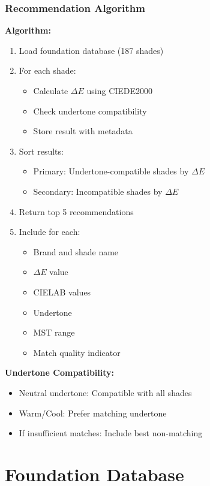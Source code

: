\subsubsection{Recommendation Algorithm}

\textbf{Algorithm:}
\begin{enumerate}
    \item Load foundation database (187 shades)
    \item For each shade:
    \begin{itemize}
        \item Calculate $\Delta E$ using CIEDE2000
        \item Check undertone compatibility
        \item Store result with metadata
    \end{itemize}
    \item Sort results:
    \begin{itemize}
        \item Primary: Undertone-compatible shades by $\Delta E$
        \item Secondary: Incompatible shades by $\Delta E$
    \end{itemize}
    \item Return top 5 recommendations
    \item Include for each:
    \begin{itemize}
        \item Brand and shade name
        \item $\Delta E$ value
        \item CIELAB values
        \item Undertone
        \item MST range
        \item Match quality indicator
    \end{itemize}
\end{enumerate}

\textbf{Undertone Compatibility:}
\begin{itemize}
    \item Neutral undertone: Compatible with all shades
    \item Warm/Cool: Prefer matching undertone
    \item If insufficient matches: Include best non-matching
\end{itemize}

\section{Foundation Database}


